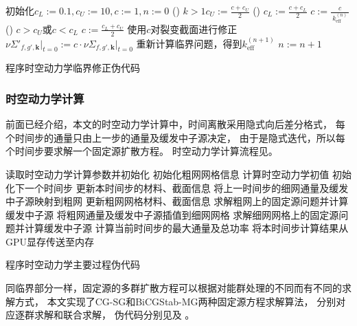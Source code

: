 \begin{algorithm}
初始化$c_L:=0.1, c_U:=10, c:=1, n:=0$\;
{
  \lIf()
  {$k>1$}{$\displaystyle c_U:=\frac{c+c_U}{2}$}
  \lElse()
  {$\displaystyle c_L:=\frac{c+c_L}{2}$}
  $\displaystyle c:=\frac{c}{\ k_\mathrm{eff}^{(n)}\ }$\;
  \If()
  {$c>c_U$或$c<c_L$}
  {$\displaystyle c:=\frac{c_L+c_U}{2}$}
  使用$c$对裂变截面进行修正
  $\nu\Sigma'_{f,g',\bm{k}}\Big|_{t=0} := c\cdot\nu\Sigma_{f,g',\bm{k}}\Big|_{t=0}$\;
  重新计算临界问题，得到$k_\mathrm{eff}^{(n+1)}$\;
  $n:=n+1$\;
}
\caption{\label{alg:program.kinetics.keff-fix}
\ProgramName 程序时空动力学临界修正伪代码}
\end{algorithm}

\subsubsection{时空动力学计算}

前面已经介绍，本文的时空动力学计算中，时间离散采用隐式向后差分格式，
每个时间步的通量只由上一步的通量及缓发中子源决定，
由于是隐式迭代，所以每个时间步要求解一个固定源扩散方程。
时空动力学计算流程见。

\begin{algorithm}
读取时空动力学计算参数并初始化\;
{
  初始化粗网网格信息\;
}
计算时空动力学初值
\;
{
  初始化下一个时间步\;
  更新本时间步的材料、截面信息\;
  {
    将上一时间步的细网通量及缓发中子源映射到粗网\;
    更新粗网网格材料、截面信息\;
    求解粗网上的固定源问题并计算缓发中子源\;
    将粗网通量及缓发中子源插值到细网网格\;
  }
  求解细网网格上的固定源问题并计算缓发中子源\;
  计算当前时间步的最大通量及总功率\;
  将本时间步计算结果从GPU显存传送至内存\;
}

\caption{\label{alg:program.kinetics.loop}
\ProgramName 程序时空动力学主要过程伪代码}
\end{algorithm}

同临界部分一样，固定源的多群扩散方程可以根据对能群处理的不同而有不同的求解方式，
本文实现了CG-SG和BiCGStab-MG两种固定源方程求解算法，
分别对应逐群求解和联合求解，
伪代码分别见及%
。

